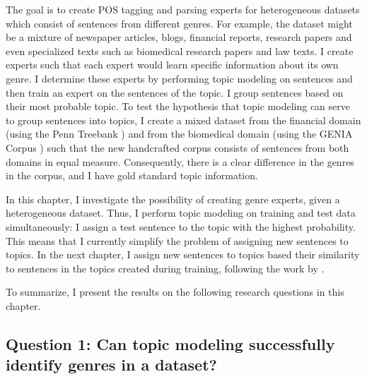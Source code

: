 The goal is to create POS tagging and parsing experts for heterogeneous datasets which consist of  sentences from different genres. For example, the dataset might be a mixture of newspaper articles, blogs, financial reports, research papers and even specialized texts such as biomedical research papers and law texts. I create experts such that each expert would learn specific information about its own genre. I determine these experts by performing topic modeling on sentences and then train an expert on the sentences of the topic. I group sentences based on their most probable topic. To test the hypothesis that topic modeling can serve to group sentences into topics, I create a mixed dataset from the financial domain (using the Penn Treebank \cite{marcus:kim:ea:94}) and from the biomedical domain (using the GENIA Corpus \cite{tateisi:tsujii:04}) such that the new handcrafted corpus consists of sentences from both domains in equal measure. Consequently, there is a clear difference in the genres in the corpus, and I have gold standard topic information.

In this chapter, I investigate the possibility of creating genre experts, given a heterogeneous dataset. Thus, I perform topic modeling on training and test data simultaneously: I assign a test sentence to the topic with the highest probability. This means that I currently simplify the problem of assigning new sentences to topics. In the next chapter, I assign new sentences to topics based their similarity to sentences in the topics created during training, following the work by . 

To summarize, I present the results on the following research questions in this chapter.

\subsection*{Question 1: Can topic modeling successfully identify genres in a dataset?} \label{q1}


